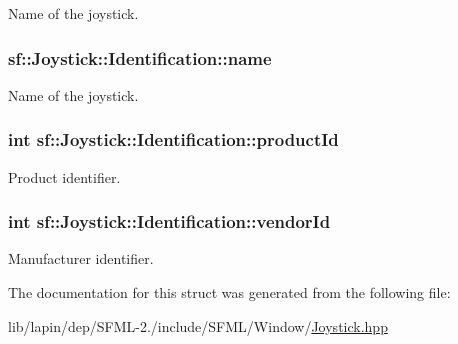 Name of the joystick. 

\hypertarget{structsf_1_1_joystick_1_1_identification_a135a9a3a4dc11c2b5cde51159b4d136d}{
\subsubsection[{name}]{ sf\-::\-Joystick\-::\-Identification\-::name}}\label{structsf_1_1_joystick_1_1_identification_a135a9a3a4dc11c2b5cde51159b4d136d}


Name of the joystick. 

\hypertarget{structsf_1_1_joystick_1_1_identification_a18c21317789f51f9a5f132677727ff77}{
\subsubsection[{product\-Id}]{ {\bf int} sf\-::\-Joystick\-::\-Identification\-::product\-Id}}\label{structsf_1_1_joystick_1_1_identification_a18c21317789f51f9a5f132677727ff77}


Product identifier. 

\hypertarget{structsf_1_1_joystick_1_1_identification_a827caf37a56492e3430e5ca6b15b5e9f}{
\subsubsection[{vendor\-Id}]{ {\bf int} sf\-::\-Joystick\-::\-Identification\-::vendor\-Id}}\label{structsf_1_1_joystick_1_1_identification_a827caf37a56492e3430e5ca6b15b5e9f}


Manufacturer identifier. 



The documentation for this struct was generated from the following file\-:\begin{DoxyCompactItemize}
\item 
lib/lapin/dep/\-S\-F\-M\-L-\/2./include/\-S\-F\-M\-L/\-Window/\hyperlink{lapin_2dep_2_s_f_m_l-2_83_2include_2_s_f_m_l_2_window_2_joystick_8hpp}{Joystick.\-hpp}\end{DoxyCompactItemize}
